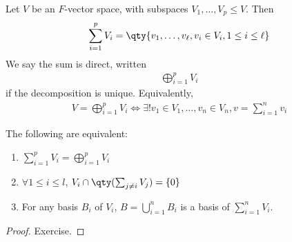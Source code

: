 \begin{definition}
    Let $V$ be an $F$-vector space, with subspaces $V_1, \dots, V_p \leq V$.
    Then
    \begin{align*}
        \sum_{i=1}^p V_i = \qty{ v_1, \dots, v_\ell, v_i \in V_i, 1 \leq i \leq \ell}
    \end{align*}
    We say the sum is direct, written
    \begin{align*}
        \bigoplus_{i=1}^p V_i
    \end{align*}
    if the decomposition is unique.
    Equivalently,
    \begin{align*}
        V = \bigoplus_{i=1}^p V_i \iff \exists!
        v_1 \in V_1, \dots, v_n \in V_n, v = \sum_{i=1}^n v_i
    \end{align*}
\end{definition}
\begin{lemma}
    The following are equivalent:
    \begin{enumerate}
        \item $\sum_{i=1}^p V_i = \bigoplus_{i=1}^p V_i$
        \item $\forall 1 \leq i \leq l$, $V_i \cap \qty( \sum_{j \neq i} V_j ) = \{0\}$
        \item For any basis $B_i$ of $V_i$, $B = \bigcup_{i=1}^n B_i$ is a basis of $\sum_{i=1}^n V_i$.
    \end{enumerate}
\end{lemma}
\begin{proof}
    Exercise.
\end{proof}